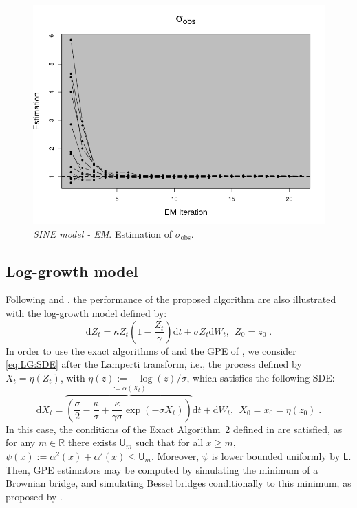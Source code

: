 \documentclass[12pt]{article}
\newcommand{\rmd}{\mathrm{d}}
\newcommand{\eqsp}{\;}
\newcommand{\1}{\mathrm{1}}
\begin{document}
\begin{figure}[p]
\centering
\includegraphics[scale=0.5]{figure_sigma2}
\caption{{\em SINE model - EM}. Estimation of $\sigma_\text{obs}$.}
\label{fig:SINE:sigma}
\end{figure}


\subsection*{Log-growth model}
Following \cite{beskos:papaspiliopoulos:roberts:fearnhead:2006} and \cite{olsson:westerborn:2016}, the performance of the proposed algorithm are also illustrated with the log-growth model defined by:
\begin{equation}
\rmd Z_t = \kappa Z_t\left(1-\frac{Z_t}{\gamma}\right)\rmd t + \sigma Z_t \rmd W_t,~~Z_0=z_0\eqsp . \label{eq:LG:SDE}
\end{equation}
In order to use the exact algorithms of \cite{beskos:papaspiliopoulos:roberts:fearnhead:2006} and the GPE of \cite{fearnhead:papaspiliopoulos:roberts:2008}, we consider  \eqref{eq:LG:SDE} after the Lamperti transform, i.e., the process defined by $X_t=\eta(Z_t)$, with $\eta(z) := -\log (z)/\sigma$,  which satisfies the following SDE:
\begin{equation}
\rmd X_t = \overbrace{\left( \frac{\sigma}{2} -  \frac{\kappa}{\sigma} + \frac{\kappa}{\gamma\sigma}\exp\left(-\sigma X_t\right)\right)}^{:=\alpha(X_t)}\rmd t +\rmd W_t,~~X_0=x_0=\eta(z_0)\eqsp.\label{eq:Lamp:LG}
\end{equation}
In this case, the conditions of the Exact Algorithm~2 defined in \cite{beskos:papaspiliopoulos:roberts:fearnhead:2006} are satisfied, as for any $m \in \mathbb{R}$ there exists $\mathsf{U}_m$ such that for all $x\ge m$, $\psi(x):=\alpha^2(x)+\alpha'(x) \leq \mathsf{U}_m$. Moreover, $\psi$ is lower bounded uniformly by  $\mathsf{L}$. 
Then, GPE estimators may be computed by simulating the minimum of a Brownian bridge, and simulating Bessel bridges conditionally to this minimum, as proposed by \cite{beskos:papaspiliopoulos:roberts:fearnhead:2006}.
\end{document}
